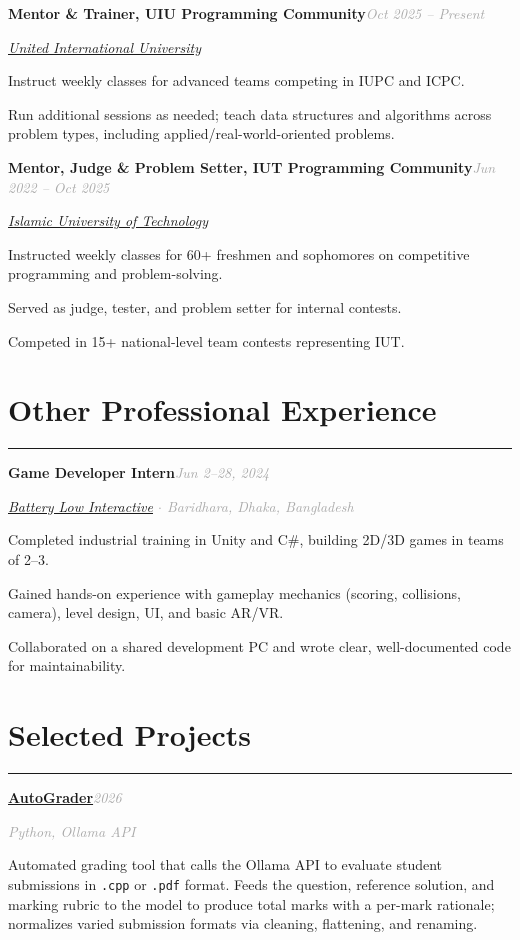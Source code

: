 \documentclass[10pt]{article}
\newcommand{\sectionrule}{\vspace{-2pt}\noindent\textcolor{rulegray}{\rule{\linewidth}{1pt}}\vspace{6pt}}
\newcommand{\cvsection}[1]{%
  \Needspace{6\baselineskip}%
  \section{#1}\sectionrule%
}
\newcommand{\cvitem}[2]{%
  \Needspace{4\baselineskip}%
  \par\vspace{6pt}\noindent\textbf{#1}\hfill\textit{\textcolor{darkgray}{#2}}\par\vspace{1pt}%
}
\newcommand{\cvsub}[1]{\textit{\textcolor{darkgray}{#1}}\par\vspace{2pt}}
\begin{document}
\cvitem{Mentor \& Trainer, UIU Programming Community}{Oct 2025 -- Present}
\cvsub{\href{https://www.uiu.ac.bd/}{United International University}}
\begin{cvitemize}
  \item Instruct weekly classes for advanced teams competing in IUPC and ICPC.
  \item Run additional sessions as needed; teach data structures and algorithms across problem types, including applied/real-world-oriented problems.
\end{cvitemize}

\cvitem{Mentor, Judge \& Problem Setter, IUT Programming Community}{Jun 2022 -- Oct 2025}
\cvsub{\href{https://www.iutoic-dhaka.edu/}{Islamic University of Technology}}
\begin{cvitemize}
  \item Instructed weekly classes for 60+ freshmen and sophomores on competitive programming and problem-solving.
  \item Served as judge, tester, and problem setter for internal contests.
  \item Competed in 15+ national-level team contests representing IUT.
\end{cvitemize}

\cvsection{Other Professional Experience}

\cvitem{Game Developer Intern}{Jun 2--28, 2024}
\cvsub{\href{https://batterylowinteractive.com/}{Battery Low Interactive} $\cdot$ Baridhara, Dhaka, Bangladesh}
\begin{cvitemize}
  \item Completed industrial training in Unity and C\#, building 2D/3D games in teams of 2--3.
  \item Gained hands-on experience with gameplay mechanics (scoring, collisions, camera), level design, UI, and basic AR/VR.
  \item Collaborated on a shared development PC and wrote clear, well-documented code for maintainability.
\end{cvitemize}

\cvsection{Selected Projects}

\cvitem{\href{https://github.com/zunaid13/Automated-Ollama-Based-Script-Checker}{AutoGrader}}{2026}
\cvsub{Python, Ollama API}
Automated grading tool that calls the Ollama API to evaluate student submissions in \texttt{.cpp} or \texttt{.pdf} format. Feeds the question, reference solution, and marking rubric to the model to produce total marks with a per-mark rationale; normalizes varied submission formats via cleaning, flattening, and renaming.
\end{document}
